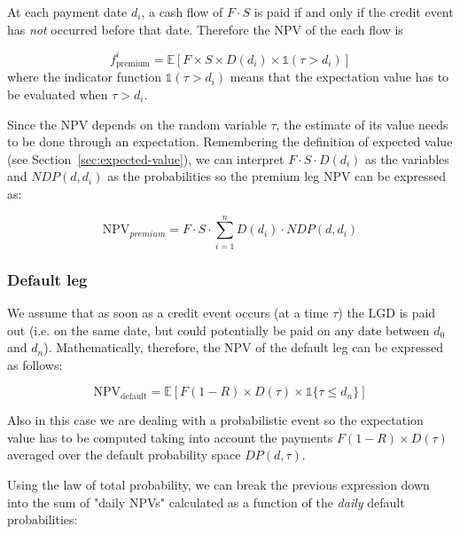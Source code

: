 At each payment date \(d_i\), a cash flow of \(F\cdot S\) is paid if and only if the credit event has \emph{not} occurred before that date. Therefore the NPV of the each flow is

\begin{equation}
f_{\textrm{premium}}^i = \mathbb{E}\left[F\times S \times D(d_i) \times \mathbb{1}(\tau > d_i) \right]
\end{equation}
where the indicator function \(\mathbb{1}(\tau > d_i)\) means that the expectation value has to be evaluated when \(\tau > d_i\). 

Since the NPV depends on the random variable $\tau$, the estimate of its value needs to be done through an expectation.
Remembering the definition of expected value (see Section~\ref{sec:expected-value}), we can interpret 
\(F\cdot S\cdot D(d_i)\) as the variables and \(NDP(d, d_i)\) as the probabilities so the premium leg NPV can be expressed as:

\begin{equation}
	\textrm{NPV}_{premium} = F\cdot S \cdot \sum_{i=1}^{n} D(d_i) \cdot NDP(d, d_i)
\end{equation}

\subsubsection{Default leg}\label{default-leg}

We assume that as soon as a credit event occurs (at a time $\tau$) the LGD is paid out (i.e. on the same date, but could potentially be paid on any date between \(d_0\) and \(d_n\)). Mathematically, therefore, the NPV of the default leg can be expressed as follows:

\begin{equation}
\mathrm{NPV_{default}} =\mathbb{E}[F(1-R) \times D(\tau) \times \mathbb{1} \{\tau \leq d_n\} ]
\end{equation}

Also in this case we are dealing with a probabilistic event so the expectation value has to be computed taking into account the payments $F(1-R)\times D(\tau)$ averaged over the default probability space $DP(d, \tau)$. 

Using the law of total probability, we can break the previous expression down into the sum of "daily NPVs" calculated as a function of the \emph{daily} default probabilities:

